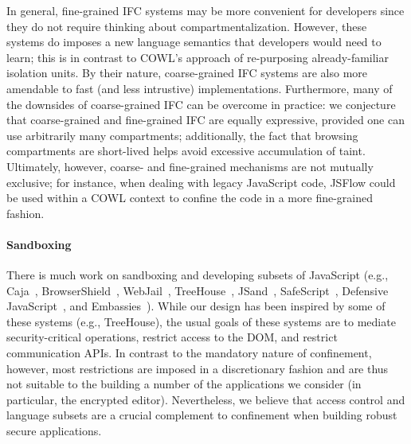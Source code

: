 In general, fine-grained IFC systems may be more convenient for
developers since they do not require thinking about
compartmentalization.
%
However, these systems do imposes a new language semantics that
developers would need to learn; this is in contrast to COWL's approach
of re-purposing already-familiar isolation units.
%
By their nature, coarse-grained IFC systems are also more
amendable to fast (and less intrustive) implementations.
%
Furthermore, many of the downsides of coarse-grained IFC can be overcome
in practice: we conjecture that coarse-grained and fine-grained IFC are
equally expressive, provided one can use arbitrarily many compartments;
additionally, the fact that browsing compartments are short-lived helps
avoid excessive accumulation of taint. 
%
Ultimately, however, coarse- and
fine-grained mechanisms are not mutually exclusive; for instance, when
dealing with legacy JavaScript code, JSFlow could be used within
a COWL context to confine the code in a more fine-grained fashion.

\paragraph{Sandboxing}
There is much work on sandboxing and developing subsets of JavaScript (e.g.,
Caja~\cite{GoogleCaja}, BrowserShield~\cite{Reis:2007},
WebJail~\cite{VanAcker:2011}, TreeHouse~\cite{Ingram:2012},
JSand~\cite{Agten:2012:JCC}, SafeScript~\cite{SafeScript}, Defensive
JavaScript~\cite{djs}, and Embassies~\cite{Howell:2013}). 
%
While our design has been inspired by some of these systems (e.g.,
TreeHouse), the usual goals of these systems are to mediate
security-critical operations, restrict access to the DOM, and restrict
communication APIs\@.
%
In contrast to the mandatory nature of confinement, however, most restrictions
are imposed in a discretionary fashion and are thus not suitable to the
building a number of the applications we consider (in particular, the encrypted
editor).
%
Nevertheless, we believe that access control and language subsets are a crucial
complement to confinement when building robust secure applications.

